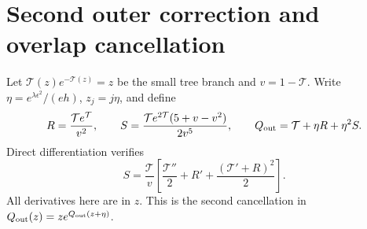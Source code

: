 \documentclass[11pt]{article}
\theoremstyle{remark}\newtheorem{remark}[theorem]{Remark}
\newcommand{\TT}{\mathcal T}
\begin{document}
\section{Second outer correction and overlap cancellation}\label{xtw:frac:sec:outer}
Let $\TT(z)e^{-\TT(z)}=z$ be the small tree branch and $v=1-\TT$.
Write $\eta=e^{\lambda\epsilon^2}/(eh)$, $z_j=j\eta$, and define
\begin{equation}\label{xtw:frac:eq:RS}
 R=\frac{\TT e^{\TT}}{v^2},\qquad
 S=\frac{\TT e^{2\TT}(5+v-v^2)}{2v^5},\qquad
 Q_{\rm out}=\TT+\eta R+\eta^2S.
\end{equation}
Direct differentiation verifies
\begin{equation}\label{xtw:frac:eq:Sidentity}
 S=\frac{\TT}{v}\left[\frac{\TT''}{2}+R'
                                      +\frac{(\TT'+R)^2}{2}\right].
\end{equation}
All derivatives here are in $z$. This is the second cancellation in
$Q_{\rm out}(z)=ze^{Q_{\rm out}(z+\eta)}$.
\end{document}
